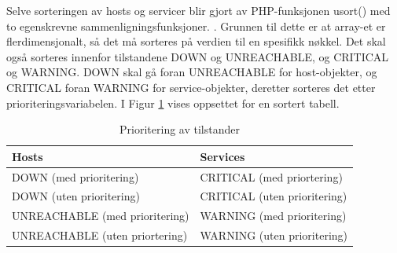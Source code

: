 Selve sorteringen av hosts og servicer blir gjort av PHP-funksjonen usort() med to egenskrevne sammenligningsfunksjoner. \cite{usort}. Grunnen til dette er at array-et er flerdimensjonalt, så det må sorteres på verdien til en spesifikk nøkkel. Det skal også sorteres innenfor tilstandene DOWN og UNREACHABLE, og CRITICAL og WARNING. DOWN skal gå foran UNREACHABLE for host-objekter, og CRITICAL foran WARNING for service-objekter, deretter sorteres det etter prioriteringsvariabelen. I Figur \ref{prioritering} vises oppsettet for en sortert tabell.

\begin{table}
\begin{center}
\begin{tabular}{ | l | l |} \hline
    \textbf{Hosts} & \textbf{Services} \\ \hline
    DOWN (med prioritering) & CRITICAL (med priortering) \\ \hline
    DOWN (uten prioritering) & CRITICAL (uten prioritering) \\ \hline
    UNREACHABLE (med prioritering) & WARNING (med prioritering) \\ \hline
    UNREACHABLE (uten priortering) & WARNING (uten prioritering) \\ \hline
\end{tabular}
\caption{Prioritering av tilstander}
\label{prioritering}
\end{center}
\end{table}

